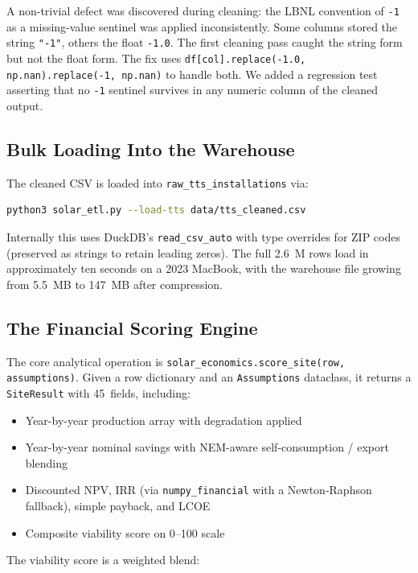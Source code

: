 \documentclass[10pt, conference]{IEEEtran}
\begin{document}
A non-trivial defect was discovered during cleaning: the LBNL convention of \texttt{-1} as a missing-value sentinel was applied inconsistently. Some columns stored the string \texttt{"-1"}, others the float \texttt{-1.0}. The first cleaning pass caught the string form but not the float form. The fix uses \texttt{df[col].replace(-1.0, np.nan).replace(-1, np.nan)} to handle both. We added a regression test asserting that no \texttt{-1} sentinel survives in any numeric column of the cleaned output.

\subsection{Bulk Loading Into the Warehouse}

The cleaned CSV is loaded into \texttt{raw\_tts\_installations} via:

\begin{lstlisting}[language=bash]
python3 solar_etl.py --load-tts data/tts_cleaned.csv
\end{lstlisting}

Internally this uses DuckDB's \texttt{read\_csv\_auto} with type overrides for ZIP codes (preserved as strings to retain leading zeros). The full 2.6~M rows load in approximately ten seconds on a 2023 MacBook, with the warehouse file growing from 5.5~MB to 147~MB after compression.

\subsection{The Financial Scoring Engine}

The core analytical operation is \texttt{solar\_economics.score\_site(row, assumptions)}. Given a row dictionary and an \texttt{Assumptions} dataclass, it returns a \texttt{SiteResult} with 45~fields, including:

\begin{itemize}
\item Year-by-year production array with degradation applied~\cite{Jordan2013}
\item Year-by-year nominal savings with NEM-aware self-consumption / export blending
\item Discounted NPV, IRR (via \texttt{numpy\_financial} with a Newton-Raphson fallback), simple payback, and LCOE
\item Composite viability score on 0--100 scale
\end{itemize}

The viability score is a weighted blend:
\end{document}
